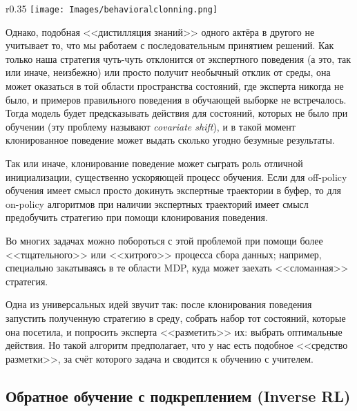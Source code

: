 \begin{wrapfigure}{r}{0.35\textwidth}
\vspace{-0.4cm}
\centering
\texttt{[image: Images/behavioralclonning.png]}
\vspace{-0.5cm}
\end{wrapfigure}

Однако, подобная <<дистилляция знаний>> одного актёра в другого не учитывает то, что мы работаем с последовательным принятием решений. Как только наша стратегия чуть-чуть отклонится от экспертного поведения (а это, так или иначе, неизбежно) или просто получит необычный отклик от среды, она может оказаться в той области пространства состояний, где эксперта никогда не было, и примеров правильного поведения в обучающей выборке не встречалось. Тогда модель будет предсказывать действия для состояний, которых не было при обучении (эту проблему называют \emph{covariate shift}), и в такой момент клонированное поведение может выдать сколько угодно безумные результаты.

\begin{remark}
Так или иначе, клонирование поведение может сыграть роль отличной инициализации, существенно ускоряющей процесс обучения. Если для off-policy обучения имеет смысл просто докинуть экспертные траектории в буфер, то для on-policy алгоритмов при наличии экспертных траекторий имеет смысл предобучить стратегию при помощи клонирования поведения. 
\end{remark}

Во многих задачах можно побороться с этой проблемой при помощи более <<тщательного>> или <<хитрого>> процесса сбора данных; например, специально закатываясь в те области MDP, куда может заехать <<сломанная>> стратегия.

\begin{example}[DAgger]
Одна из универсальных идей звучит так: после клонирования поведения запустить полученную стратегию в среду, собрать набор тот состояний, которые она посетила, и попросить эксперта <<разметить>> их: выбрать оптимальные действия. Но такой алгоритм предполагает, что у нас есть подобное <<средство разметки>>, за счёт которого задача и сводится к обучению с учителем.
\end{example}


\subsection{Обратное обучение с подкреплением (Inverse RL)}\label{subsec_irl}

